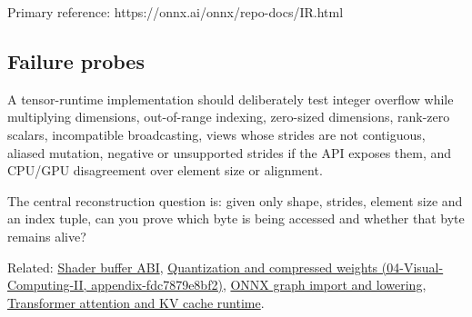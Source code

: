Primary reference: https://onnx.ai/onnx/repo-docs/IR.html

\subsection{Failure probes}\label{failure-probes}

A tensor-runtime implementation should deliberately test integer overflow while multiplying dimensions, out-of-range indexing, zero-sized dimensions, rank-zero scalars, incompatible broadcasting, views whose strides are not contiguous, aliased mutation, negative or unsupported strides if the API exposes them, and CPU/GPU disagreement over element size or alignment.

The central reconstruction question is: given only shape, strides, element size and an index tuple, can you prove which byte is being accessed and whether that byte remains alive?

Related: \hyperref[appendix-749048795dbb]{Shader buffer ABI}, \href{}{Quantization and compressed weights (04-Visual-Computing-II, appendix-fdc7879e8bf2)}, \hyperref[appendix-a87217e3af2b]{ONNX graph import and lowering}, \hyperref[appendix-ea2dadd21ce5]{Transformer attention and KV cache runtime}.
